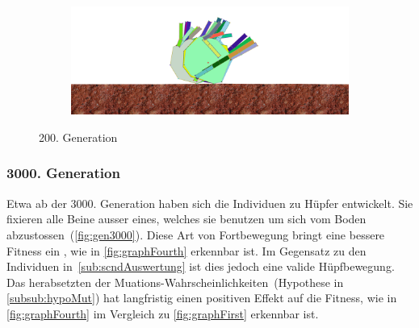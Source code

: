 \begin{figure}[H]
\begin{subfigure}[b]{0.45\textwidth}
                \includegraphics[width=\linewidth,center]{graphics/simulation-results/4_gen200_4}
                \caption{\label{fig:gen200_4}}
              \end{subfigure}
              \caption{200. Generation \label{fig:gen200}}
            \end{figure}


          \subsubsection{3000. Generation}
            Etwa ab der 3000. Generation haben sich die Individuen zu Hüpfer entwickelt.
            Sie fixieren alle Beine ausser eines, welches sie benutzen um sich vom Boden abzustossen~(\vref{fig:gen3000}).
            Diese Art von Fortbewegung bringt eine bessere Fitness ein , wie in \vref{fig:graphFourth} erkennbar ist.
            Im Gegensatz zu den Individuen in~\vref{sub:scndAuswertung} ist dies jedoch eine valide Hüpfbewegung.
            Das herabsetzten der Muations-Wahrscheinlichkeiten~(Hypothese in \vref{subsub:hypoMut}) hat langfristig einen positiven Effekt auf die Fitness,
            wie in \vref{fig:graphFourth} im Vergleich zu \vref{fig:graphFirst} erkennbar ist.

            \vspace{0.5cm}

